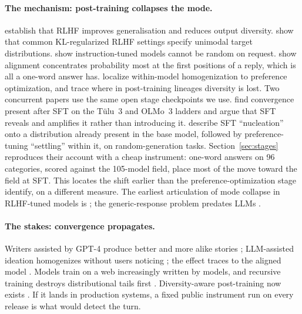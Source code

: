 \documentclass[11pt]{article}
\begin{document}
\paragraph{The mechanism: post-training collapses the mode.}
\citet{kirk2024rlhf} establish that RLHF improves generalisation and reduces output diversity. \citet{gxchen2025kl} show that common KL-regularized RLHF settings specify unimodal target distributions. \citet{zhang2024diffuse} show instruction-tuned models cannot be random on request. \citet{yang2025concentration} show alignment concentrates probability most at the first positions of a reply, which is all a one-word answer has. \citet{liu2026alignmenttax} localize within-model homogenization to preference optimization, and \citet{karouzos2026where} trace where in post-training lineages diversity is lost. Two concurrent papers use the same open stage checkpoints we use. \citet{fortier2026convergence} find convergence present after SFT on the Tülu~3 and OLMo~3 ladders and argue that SFT reveals and amplifies it rather than introducing it. \citet{samanta2026crystallization} describe SFT ``nucleation'' onto a distribution already present in the base model, followed by preference-tuning ``settling'' within it, on random-generation tasks. Section~\ref{sec:stages} reproduces their account with a cheap instrument: one-word answers on 96 categories, scored against the 105-model field, place most of the move toward the field at SFT. This locates the shift earlier than the preference-optimization stage \citet{liu2026alignmenttax} identify, on a different measure. The earliest articulation of mode collapse in RLHF-tuned models is \citet{janus2022mode}; the generic-response problem predates LLMs \citep{li2016diversity}.

\paragraph{The stakes: convergence propagates.}
Writers assisted by GPT-4 produce better and more alike stories \citep{doshi2024generative}; LLM-assisted ideation homogenizes without users noticing \citep{anderson2024homogenization}; the effect traces to the aligned model \citep{padmakumar2024writing}. Models train on a web increasingly written by models, and recursive training destroys distributional tails first \citep{shumailov2024curse,guo2024curious}. Diversity-aware post-training now exists \citep{li2025darling}. If it lands in production systems, a fixed public instrument run on every release is what would detect the turn.
\end{document}

